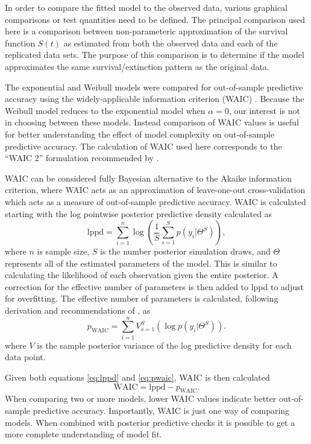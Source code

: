 \documentclass[12pt,letterpaper]{article}
\begin{document}
In order to compare the fitted model to the observed data, various graphical comparisons or test quantities need to be defined. The principal comparison used here is a comparison between non-parameteric approximation of the survival function \(S(t)\) as estimated from both the observed data and each of the replicated data sets. The purpose of this comparison is to determine if the model approximates the same survival/extinction pattern as the original data. 

The exponential and Weibull models were compared for out-of-sample predictive accuracy using the widely-applicable information criterion (WAIC) \citep{Watanabe2010a}. Because the Weibull model reduces to the exponential model when \(\alpha = 0\), our interest is not in choosing between these models. Instead comparison of WAIC values is useful for better understanding the effect of model complexity on out-of-sample predictive accuracy. The calculation of WAIC used here corresponds to the ``WAIC 2'' formulation recommended by \citet{Gelman2013d}.

WAIC can be considered fully Bayesian alternative to the Akaike information criterion, where WAIC acts as an approximation of leave-one-out cross-validation which acts as a measure of out-of-sample predictive accuracy. WAIC is calculated starting with the log pointwise posterior predictive density calculated as
\begin{equation}
  \mathrm{lppd} = \sum_{i = 1}^{n} \log \left(\frac{1}{S} \sum_{s = 1}^{S} p(y_{i}|\Theta^{S})\right),
  \label{eq:lppd}
\end{equation}
where \(n\) is sample size, \(S\) is the number posterior simulation draws, and \(\Theta\) represents all of the estimated parameters of the model. This is similar to calculating the likelihood of each observation given the entire posterior. A correction for the effective number of parameters is then added to lppd to adjust for overfitting. The effective number of parameters is calculated, following derivation and recommendations of \citep{Gelman2013d}, as
\begin{equation}
  p_{\mathrm{WAIC}} = \sum_{i = 1}^{n} V_{s = 1}^{S} (\log p(y_{i}|\Theta^{S})).
  \label{eq:pwaic}
\end{equation}
where \(V\) is the sample posterior variance of the log predictive density for each data point.

Given both equations \ref{eq:lppd} and \ref{eq:pwaic}, WAIC is then calculated
\begin{equation}
  \mathrm{WAIC} = \mathrm{lppd} - p_{\mathrm{WAIC}}.
  \label{eq:waic}
\end{equation}
When comparing two or more models, lower WAIC values indicate better out-of-sample predictive accuracy. Importantly, WAIC is just one way of comparing models. When combined with posterior predictive checks it is possible to get a more complete understanding of model fit.

\end{document}
